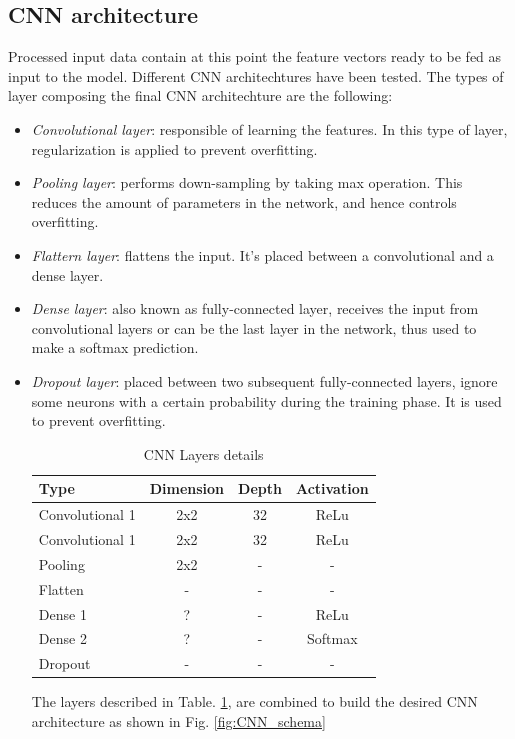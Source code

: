 \subsection*{\textbf {CNN architecture}}
\label{subsec:arch}
\noindent Processed input data contain at this point the feature vectors ready to be fed as input to the model. Different CNN architechtures have been tested. The types of layer composing the final CNN architechture are the following:
\begin{itemize}
\item {\it{Convolutional layer}}: responsible of learning the features. In this type of layer, regularization is applied to prevent overfitting.
\item {\it{Pooling layer}}: performs down-sampling by taking max operation. This reduces the amount of parameters in the network, and hence controls overfitting.
\item {\it{Flattern layer}}: flattens the input. It's placed between a convolutional and a dense layer.
\item {\it{Dense layer}}: also known as fully-connected layer, receives the input from convolutional layers or can be the last layer in the network, thus used to make a softmax prediction.
\item {\it{Dropout layer}}: placed between two subsequent fully-connected layers, ignore some neurons with a certain probability during the training phase. It is used to prevent overfitting.\\

\begin{table}[h!]
\centering
\begin{tabular}{| p{3cm} c c c |}
 \hline
Type & Dimension & Depth & Activation\\
\hline
Convolutional 1 & 2x2 & 32 & ReLu \\
Convolutional 1 & 2x2 & 32 & ReLu \\
Pooling & 2x2 & - & -\\
Flatten & - & - & -\\
Dense 1 & ? & - & ReLu \\
Dense 2 & ? & - &Softmax \\
Dropout & - &  - & -\\
\hline
\end{tabular}
\caption{CNN Layers details}
\label{table:CNN_details}
\end{table}

The layers described in Table. \ref{table:CNN_details}, are combined to build the desired CNN architecture as shown in Fig. \ref{fig:CNN_schema}

\end{itemize}
